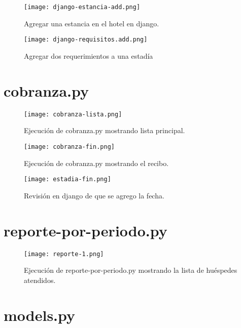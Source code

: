 \documentclass[
  12pt,
  hidelinks,
  a4paper,
  headings=standardclasses,
  headings=big,
  spanish
]{scrartcl}
\begin{document}
\begin{figure}[H]
  \centering
  \texttt{[image: django-estancia-add.png]}
  \caption{Agregar una estancia en el hotel en django.}
\end{figure}

\begin{figure}[H]
  \centering
  \texttt{[image: django-requisitos.add.png]}
  \caption{Agregar dos requerimientos a una estadía}
\end{figure}

\pagebreak
\section{cobranza.py}

\begin{figure}[H]
  \centering
  \texttt{[image: cobranza-lista.png]}
  \caption{Ejecución de cobranza.py mostrando lista principal.}
\end{figure}

\begin{figure}[H]
  \centering
  \texttt{[image: cobranza-fin.png]}
  \caption{Ejecución de cobranza.py mostrando el recibo.}
\end{figure}

\begin{figure}[H]
  \centering
  \texttt{[image: estadia-fin.png]}
  \caption{Revisión en django de que se agrego la fecha.}
\end{figure}

\pagebreak
\section{reporte-por-periodo.py}

\begin{figure}[H]
  \centering
  \texttt{[image: reporte-1.png]}
  \caption{Ejecución de reporte-por-periodo.py mostrando la lista de huéspedes atendidos.}
\end{figure}

\pagebreak
\section{models.py}


\end{document}
